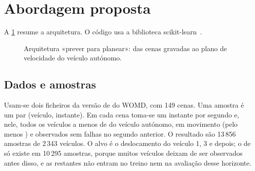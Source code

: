 \section{Abordagem proposta}
\label{sec:abordagem}

A \cref{fig:arquitetura} resume a arquitetura. O código usa a biblioteca
scikit-learn~\cite{pedregosa2011scikit}.

\begin{figure}[t]
\centering
{}
\caption{Arquitetura «prever para planear»: das cenas gravadas ao plano de
  velocidade do veículo autónomo.}
\label{fig:arquitetura}
\end{figure}

\subsection{Dados e amostras}

Usam-se dois ficheiros da versão de  do WOMD, com 149 cenas.
Uma amostra é um par (veículo, instante). Em cada cena toma-se um
instante por segundo e, nele, todos os veículos a menos de  do
veículo autónomo, em movimento (pelo menos ) e observados sem
falhas no segundo anterior. O resultado são 13\,856 amostras de 2\,343
veículos. O alvo é o deslocamento do veículo 1, 3 e  depois; o
de  só existe em 10\,295 amostras, porque muitos veículos deixam
de ser observados antes disso, e as restantes não entram no treino nem na
avaliação desse horizonte.

